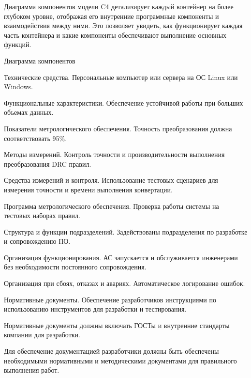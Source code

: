 Диаграмма компонентов модели C4 детализирует
каждый контейнер на более глубоком уровне,
отображая его внутренние программные компоненты и взаимодействия между ними.
Это позволяет увидеть, как функционирует каждая часть контейнера
и какие компоненты обеспечивают выполнение основных функций.

\begin{image}
	\caption{Диаграмма компонентов}
	\label{fig:c4:components}
\end{image}


Технические средства.
Персональные компьютер или сервера на ОС Linux или Windows.

Функциональные характеристики.
Обеспечение устойчивой работы при больших объемах данных.


Показатели метрологического обеспечения.
Точность преобразования должна соответствовать 95\%.

Методы измерений.
Контроль точности и производительности выполнения преобразования DRC правил.

Средства измерений и контроля.
Использование тестовых сценариев для измерения точности
и времени выполнения конвертации.

Программа метрологического обеспечения.
Проверка работы системы на тестовых наборах правил.


Структура и функции подразделений.
Задействованы подразделения по разработке и сопровождению ПО.

Организация функционирования.
АС запускается и обслуживается инженерами
без необходимости постоянного сопровождения.

Организация при сбоях, отказах и авариях.
Автоматическое логирование ошибок.

Нормативные документы.
Обеспечение разработчиков инструкциями по использованию инструментов
для разработки и тестирования.


Нормативные документы должны включать
ГОСТы и внутренние стандарты компании для разработки.

Для обеспечение документацией разработчики
должны быть обеспечены необходимыми нормативными
и методическими документами для правильного выполнения работ.

